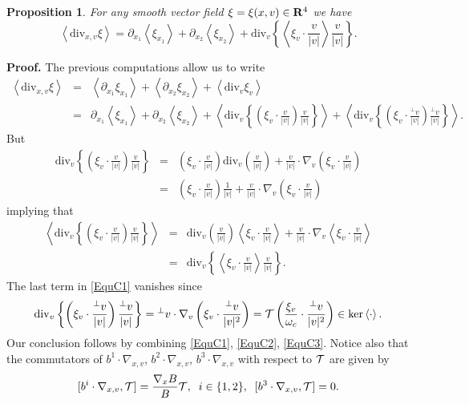 \documentclass[12pt, a4paper]{article}
\providecommand\mathbb{\bf}
\newcommand\R{{\mathbb R}}
\newtheorem{pro}{Proposition}[section]
\newcounter{steps}
\newenvironment{proof}[1][]{%
\par\medbreak\setcounter{steps}{0}
{\noindent\bfseries Proof#1. }} {\hfill\fbox{\ }\medbreak}
\newcommand{\Divv}[0]{
\mathrm{div}_v}
\newcommand{\Divxv}[0]{
\mathrm{div}_{x,v}}
\newcommand{\nxv}[0]{
\nabla_{x,v}}
\newcommand{\ave}[1]{
\left \langle #1 \right \rangle }
\begin{document}
\begin{pro}
\label{DivAveCom} For any smooth vector field $\xi = \xi (x,v) \in \R^4$ we have
\[
\ave{\Divxv \xi} = \partial _{x_1} \ave{\xi _{x_1}} + \partial _{x_2} \ave{\xi _{x_2}} + \Divv \left \{\ave{\xi _v \cdot \frac{v}{|v|}} \frac{v}{|v|}   \right  \}.
\]
\end{pro}
\begin{proof}
The previous computations allow us to write
\begin{eqnarray}
\label{EquC1} \ave{\Divxv \xi } & = & \ave{\partial _{x_1} \xi _{x_1}} + \ave{\partial _{x_2} \xi _{x_2}} + \ave{\Divv  \xi _v}  \\
& = & \partial _{x_1} \ave{\xi _{x_1}} + \partial _{x_2} \ave{\xi _{x_2}} + \ave{\Divv \left \{ \left (\xi _v \cdot \frac{v}{|v|}    \right ) \frac{v}{|v|}   \right \}} + \ave{\Divv \left \{ \left (\xi _v \cdot \frac{^\perp v}{|v|}    \right ) \frac{^\perp v}{|v|}   \right \}}.\nonumber
\end{eqnarray}
But 
\begin{eqnarray}
\Divv \left \{ \left (\xi _v \cdot \frac{v}{|v|}    \right ) \frac{v}{|v|}   \right \} & = & \left (\xi _v \cdot \frac{v}{|v|}    \right ) \Divv \left ( \frac{v}{|v|} \right ) + \frac{v}{|v|} \cdot \nabla _v \left ( \xi _v \cdot \frac{v}{|v|} \right ) \nonumber \\
& = &  \left (\xi _v \cdot \frac{v}{|v|}    \right )\frac{1}{|v|} +  \frac{v}{|v|}   \cdot \nabla _v \left (\xi _v \cdot \frac{v}{|v|}    \right ) \nonumber
\end{eqnarray}
implying that 
\begin{eqnarray}
\label{EquC2} \ave{\Divv \left \{ \left (\xi _v \cdot \frac{v}{|v|}    \right ) \frac{v}{|v|}   \right \}} & = & \Divv \left ( \frac{v}{|v|}  \right ) \ave{\xi _v \cdot \frac{v}{|v|} } + \frac{v}{|v|} \cdot \nabla _v \ave{\xi _v \cdot \frac{v}{|v|}} \nonumber \\
& = & \Divv \left \{ \ave{\xi _v \cdot \frac{v}{|v|} } \frac{v}{|v|}  \right \}.
\end{eqnarray}
The last term in \eqref{EquC1} vanishes since
\begin{equation}
\label{EquC3} \Divv \left \{ \left (\xi _v \cdot \frac{^\perp v}{|v|}    \right ) \frac{^\perp v}{|v|}   \right \} = {^\perp v} \cdot \nabla _v \left ( \xi _v \cdot \frac{^\perp v }{|v|^2} \right ) = {\cal T} \left (  \frac{\xi _v}{\omega _c} \cdot \frac{^\perp v}{|v|^2} \right ) \in \ker \ave{\cdot}.
\end{equation}
Our conclusion follows by combining \eqref{EquC1}, \eqref{EquC2}, \eqref{EquC3}.
\end{proof}
Notice also that the commutators of $b^1 \cdot \nxv$, $b^2 \cdot \nxv$, $b^3 \cdot \nxv$ with respect to ${\cal T}$ are given by
\[
[b^i\cdot \nxv , {\cal T}]= \frac{\nabla _x B}{B} {\cal T},\;\;i \in \{1,2\},\;\;
[b^3 \cdot \nxv, {\cal T}] = 0.
\]
\end{document}
